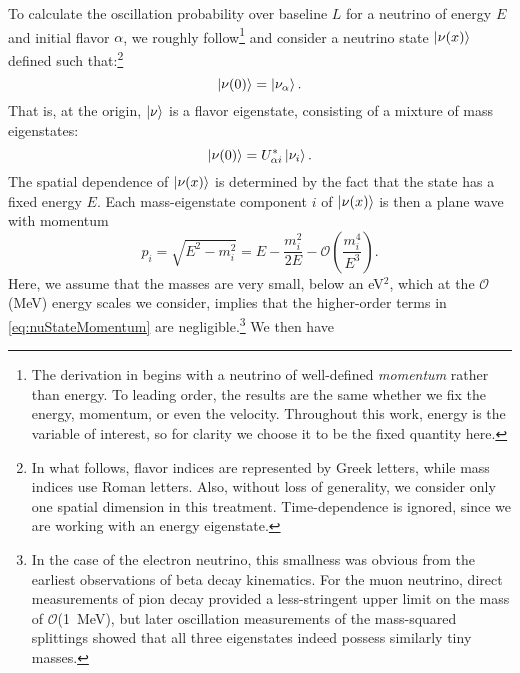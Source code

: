 \documentclass[../thesis.tex]{subfiles}
\begin{document}
To calculate the oscillation probability over baseline $L$ for a neutrino of energy
$E$ and initial flavor $\alpha$, we roughly follow\footnote{The derivation in \cite{Giunti_2007} begins with a neutrino of well-defined \emph{momentum} rather than energy. To leading order, the results are the same whether we fix the energy, momentum, or even the velocity. Throughout this work, energy is the variable of interest, so for clarity we choose it to be the fixed quantity here.} \cite{Giunti_2007} and consider a neutrino state $\ket{\nu(x)}$ defined such that:\footnote{In what follows, flavor indices are represented by Greek letters, while mass indices use Roman letters. Also, without loss of generality, we consider only one spatial dimension in this treatment. Time-dependence is ignored, since we are working with an energy eigenstate.}
\begin{equation}
  \ket{\nu(0)} = \ket{\nu_\alpha}.
\end{equation}
That is, at the origin, $\ket{\nu}$ is a flavor eigenstate, consisting of a mixture of mass eigenstates:
\begin{equation}
  \ket{\nu(0)} = U^*_{\alpha i}\ket{\nu_i}.
\end{equation}
The spatial dependence of $\ket{\nu(x)}$ is determined by the fact that the state has a fixed energy $E$. Each mass-eigenstate component $i$ of $\ket{\nu(x)}$ is then a plane wave with momentum
\begin{equation}
  \label{eq:nuStateMomentum}
  p_i = \sqrt{E^2 - m_i^2} = E - \frac{m_i^2}{2E} - \mathcal{O}\left( \frac{m_i^4}{E^3} \right).
\end{equation}
Here, we assume that the masses are very small, below an eV$^2$, which at the $\mathcal{O}$(MeV) energy scales we consider, implies that the higher-order terms in \autoref{eq:nuStateMomentum} are negligible.\footnote{In the case of the electron neutrino, this smallness was obvious from the earliest observations of beta decay kinematics. For the muon neutrino, direct measurements of pion decay \cite{BOOTH196739} provided a less-stringent upper limit on the mass of $\mathcal{O}$(1~MeV), but later oscillation measurements of the mass-squared splittings showed that all three eigenstates indeed possess similarly tiny masses.} We then have
\end{document}
